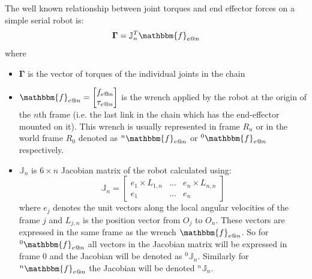 \documentclass[a4paper,10pt]{article}
\begin{document}
The well known relationship between joint torques and end effector forces on a simple serial robot is:
\[
 \mathbf{\Gamma} = \mathbb{J}_n^T\mathbbm{f}_{e@n}
\] where
\begin{itemize}
 \item $\mathbf{\Gamma}$ is the vector of torques of the individual joints in the chain
 \item $\mathbbm{f}_{e@n} = \left[ \begin{matrix} f_{e@n} \\ \tau_{e@n} \end{matrix} \right]$ is the wrench applied by the robot at
 the origin of the $n$th frame (i.e. the last link in the chain which has the end-effector mounted on it). This wrench is usually
 represented in frame $R_n$ or in the world frame $R_0$ denoted as ${}^n\mathbbm{f}_{e@n}$ or ${}^0\mathbbm{f}_{e@n}$ respectively.
 \item $\mathbb{J}_n$ is $6 \times n$ Jacobian matrix of the robot calculated using:
 \[
   \mathbb{J}_n = \left[ \begin{matrix} e_1\times L_{1,n} & ... & e_n\times L_{n,n} \\ e_1 & ... & e_n \end{matrix} \right]
 \] where $e_j$ denotes the unit vectors along the local angular velocities of the frame $j$ and $L_{j,n}$ is the
 position vector from $O_j$ to $O_n$. These vectors are expressed in the same frame as the wrench $\mathbbm{f}_{e@n}$.
 So for ${}^0\mathbbm{f}_{e@n}$ all vectors in the Jacobian matrix will be expressed in frame $0$ and the Jacobian will
 be denoted as ${}^0\mathbb{J}_n$. Similarly for ${}^n\mathbbm{f}_{e@n}$ the Jacobian will be denoted ${}^n\mathbb{J}_n$.
\end{itemize}
\end{document}
